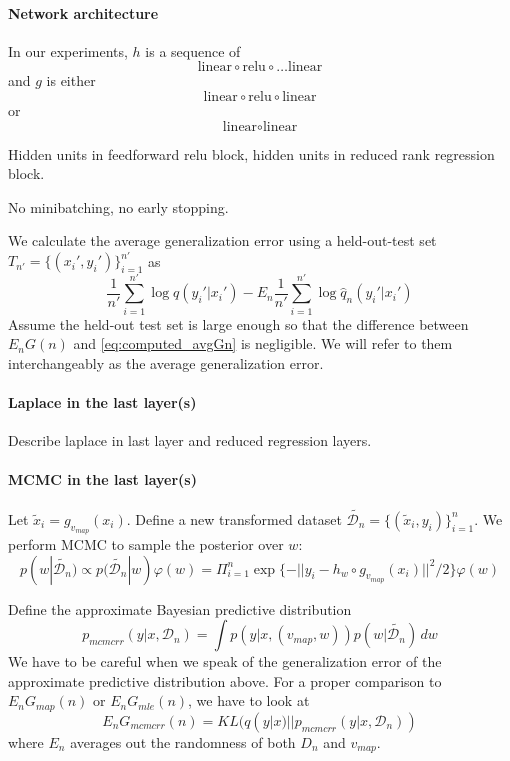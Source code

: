 \documentclass{article} %
\begin{document}
\paragraph{Network architecture} In our experiments, $h$ is a sequence of 
\[
\text{linear} \circ \text{relu} \circ \ldots \text{linear}
\]
and $g$ is either
\begin{equation}
    \text{linear} \circ \text{relu} \circ \text{linear} 
\end{equation}
or
\begin{equation}
    \text{linear}  \circ \text{linear} 
\end{equation}

Hidden units in feedforward relu block, hidden units in reduced rank regression block.

No minibatching, no early stopping.


We calculate the average generalization error using a held-out-test set $T_{n'} = \{(x_i',y_i')\}_{i=1}^{n'}$ as
\begin{equation}
\frac{1}{n'} \sum_{i=1}^{n'} \log q(y_i'|x_i') - E_n \frac{1}{n'} \sum_{i=1}^{n'} \log \hat q_n(y_i'|x_i')
\label{eq:computed_avgGn}
\end{equation}
Assume the held-out test set is large enough so that the difference between $E_n G(n)$ and \eqref{eq:computed_avgGn} is negligible. We will refer to them interchangeably as the average generalization error. 

\paragraph{Laplace in the last layer(s)}
Describe laplace in last layer and reduced regression layers.


\paragraph{MCMC in the last layer(s)}
 Let $\tilde x_i = g_{v_{map}}(x_i)$. Define a new transformed dataset $\tilde{\mathcal D_n} = \{(\tilde x_i, y_i) \}_{i=1}^n$. We perform MCMC to sample the posterior over $w$:
$$
p(w | \tilde{\mathcal D_n}) \propto p(\tilde{\mathcal D_n} | w) \varphi(w) = \Pi_{i=1}^n \exp\{-|| y_i - h_w \circ g_{v_{map}}(x_i) ||^2/2\} \varphi(w)
$$

Define the approximate Bayesian predictive distribution
$$
p_{mcmcrr}(y|x, \mathcal D_n) = \int p(y|x,(v_{map},w)) p(w|\tilde{\mathcal D_n}) \,dw
$$
We have to be careful when we speak of the generalization error of the approximate predictive distribution above. For a proper comparison to $E_n G_{map}(n)$ or $E_n G_{mle}(n)$, we have to look at 
\begin{equation}
E_n G_{mcmcrr}(n) =  KL (q(y|x) || p_{mcmcrr}(y|x, \mathcal D_n) )
\label{G_LLB}
\end{equation}
where $E_n$ averages out the randomness of both $D_n$ and  $v_{map}$. 
\end{document}
